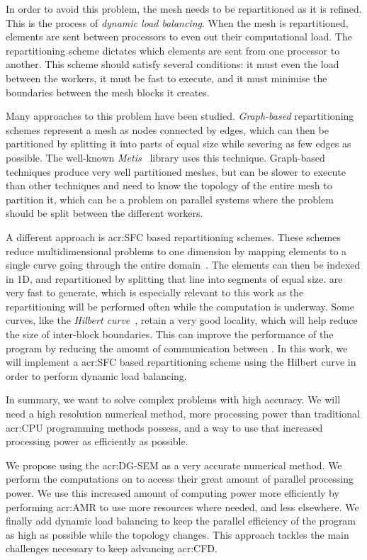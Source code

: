 In order to avoid this problem, the mesh needs to be repartitioned as it is refined. This is the
process of \textit{dynamic load balancing}. When the mesh is repartitioned, elements are sent
between processors to even out their computational load. The repartitioning scheme dictates which
elements are sent from one processor to another. This scheme should satisfy several conditions: it
must even the load between the workers, it must be fast to execute, and it must minimise the
boundaries between the mesh blocks it creates. 

Many approaches to this problem have been studied. \textit{Graph-based} repartitioning schemes
represent a mesh as nodes connected by edges, which can then be partitioned by splitting it into
parts of equal size while severing as few edges as possible. The well-known
\textit{Metis}~\cite{Karypis1998} library uses this technique. Graph-based techniques produce very
well partitioned meshes, but can be slower to execute than other techniques and need to know the
topology of the entire mesh to partition it, which can be a problem on parallel systems where the
problem should be split between the different workers.

A different approach is \acrfull{acr:SFC} based repartitioning schemes. These schemes reduce
multidimensional problems to one dimension by mapping elements to a single curve going through the
entire domain~\cite{Peano1890}. The elements can then be indexed in 1D, and repartitioned by
splitting that line into segments of equal size.  are very fast to generate,
which is especially relevant to this work as the repartitioning will be performed often while the
computation is underway. Some curves, like the \textit{Hilbert curve}~\cite{Hilbert1891}, retain a
very good locality, which will help reduce the size of inter-block boundaries. This can improve the
performance of the program by reducing the amount of communication between . In
this work, we will implement a \acrshort{acr:SFC} based repartitioning scheme using the Hilbert
curve in order to perform dynamic load balancing.

In summary, we want to solve complex problems with high accuracy. We will need a high resolution
numerical method, more processing power than traditional \acrshort{acr:CPU} programming methods
possess, and a way to use that increased processing power as efficiently as possible. 

We propose using the \acrlong{acr:DG-SEM} as a very accurate numerical method. We perform the
computations on  to access their great amount of parallel processing power. We
use this increased amount of computing power more efficiently by performing \acrlong{acr:AMR} to use
more resources where needed, and less elsewhere. We finally add dynamic load balancing to keep the
parallel efficiency of the program as high as possible while the topology changes. This approach
tackles the main challenges necessary to keep advancing \acrshort{acr:CFD}.

